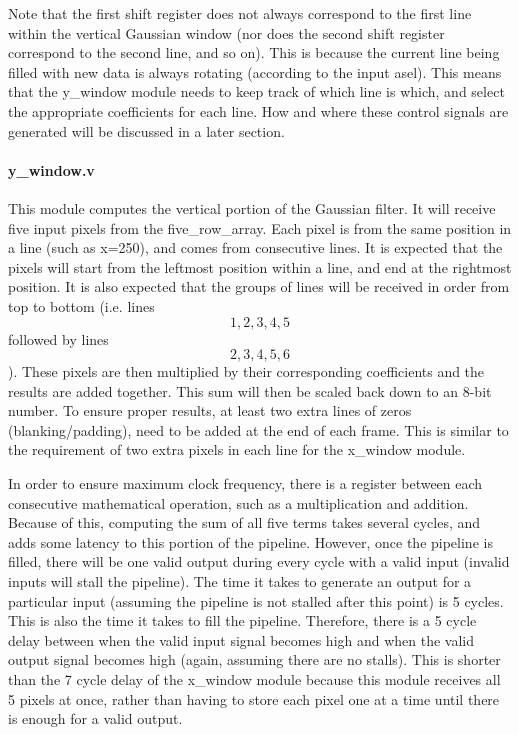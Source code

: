 \documentclass[12pt]{article}
\begin{document}
Note that the first shift register does not always correspond to the first line 
within the vertical Gaussian window (nor does the second shift register 
correspond to the second line, and so on). This is because the current line 
being filled with new data is always rotating (according to the input asel). 
This means that the y\_window module needs to keep track of which line is which, 
and select the appropriate coefficients for each line. How and where these 
control signals are generated will be discussed in a later section.

\paragraph{y\_window.v} 

This module computes the vertical portion of the Gaussian filter. It 
will receive five input pixels from the five\_row\_array. Each pixel is from the 
same position in a line (such as x=250), and comes from consecutive lines. It is 
expected that the pixels will start from the leftmost position within a line, 
and end at the rightmost position. It is also expected that the groups of lines 
will be received in order from top to bottom (i.e. lines \[1,2,3,4,5\] followed by 
lines \[2,3,4,5,6\]). These pixels are then multiplied by their corresponding 
coefficients and the results are added together. This sum will then be scaled 
back down to an 8-bit number. To ensure proper results, at least two extra lines 
of zeros (blanking/padding), need to be added at the end of each frame. This is 
similar to the requirement of two extra pixels in each line for the x\_window 
module.

In order to ensure maximum clock frequency, there is a register between each 
consecutive mathematical operation, such as a multiplication and addition. 
Because of this, computing the sum of all five terms takes several cycles, and 
adds some latency to this portion of the pipeline. However, once the pipeline is 
filled, there will be one valid output during every cycle with a valid input 
(invalid inputs will stall the pipeline). The time it takes to generate an 
output for a particular input (assuming the pipeline is not stalled after this 
point) is 5 cycles. This is also the time it takes to fill the pipeline. 
Therefore, there is a 5 cycle delay between when the valid input signal becomes 
high and when the valid output signal becomes high (again, assuming there are no 
stalls). This is shorter than the 7 cycle delay of the x\_window module because 
this module receives all 5 pixels at once, rather than having to store each 
pixel one at a time until there is enough for a valid output.
\end{document}
